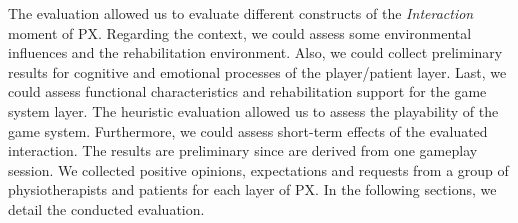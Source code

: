 \begin{table}[bth]
\myfloatalign
\caption{Two-stages evaluation to assess the interaction and effects moments of \ac{PX} in Playtherapy}
\label{tab:interactionEffectsEvaluation}
\end{table}

The evaluation allowed us to evaluate different constructs of the \textit{Interaction} moment of \ac{PX}. Regarding the context, we could assess some environmental influences and the rehabilitation environment. Also, we could collect preliminary results for cognitive and emotional processes of the player/patient layer. Last, we could assess functional characteristics and rehabilitation support for the game system layer. The heuristic evaluation allowed us to assess the playability of the game system. Furthermore, we could assess short-term effects of the evaluated interaction. The results are preliminary since are derived from one gameplay session. We collected positive opinions, expectations and requests from a group of physiotherapists and patients for each layer of \ac{PX}. In the following sections, we detail the conducted evaluation.

